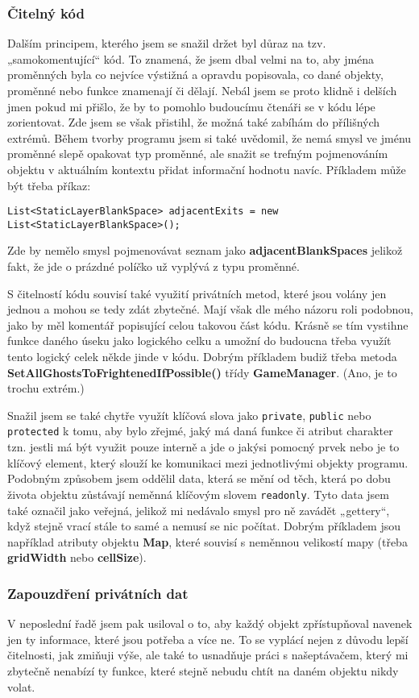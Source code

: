\documentclass[a4]{article}
\begin{document}
\subsubsection{Čitelný kód}
Dalším principem, kterého jsem se snažil držet byl důraz na tzv. „samokomentující“ kód. To znamená, že jsem dbal velmi na to, aby jména proměnných byla co nejvíce výstižná a opravdu popisovala, co dané objekty, proměnné nebo funkce znamenají či dělají. Nebál jsem se proto klidně i delších jmen pokud mi přišlo, že by to pomohlo budoucímu čtenáři se v kódu lépe zorientovat. Zde jsem se však přistihl, že možná také zabíhám do přílišných extrémů. Během tvorby programu jsem si také uvědomil, že nemá smysl ve jménu proměnné slepě opakovat typ proměnné, ale snažit se trefným pojmenováním objektu v aktuálním kontextu přidat informační hodnotu navíc. Příkladem může být třeba příkaz: 

\verb|List<StaticLayerBlankSpace> adjacentExits = new List<StaticLayerBlankSpace>();|

Zde by nemělo smysl pojmenovávat seznam jako \textbf{adjacentBlankSpaces} jelikož fakt, že jde o prázdné políčko už vyplývá z typu proměnné.

S čitelností kódu souvisí také využití privátních metod, které jsou volány jen jednou a mohou se tedy zdát zbytečné. Mají však dle mého názoru roli podobnou, jako by měl komentář popisující celou takovou část kódu. Krásně se tím vystihne funkce daného úseku jako logického celku a umožní do budoucna třeba využít tento logický celek někde jinde v kódu. Dobrým příkladem budiž třeba metoda \textbf{SetAllGhostsToFrightenedIfPossible()} třídy \textbf{GameManager}. (Ano, je to trochu extrém.)

Snažil jsem se také chytře využít klíčová slova jako \verb|private|, \verb|public| nebo \verb|protected| k tomu, aby bylo zřejmé, jaký má daná funkce či atribut charakter tzn. jestli má být využit pouze interně a jde o jakýsi pomocný prvek nebo je to klíčový element, který slouží ke komunikaci mezi jednotlivými objekty programu. Podobným způsobem jsem oddělil data, která se mění od těch, která po dobu života objektu zůstávají neměnná klíčovým slovem \verb|readonly|. Tyto data jsem také označil jako veřejná, jelikož mi nedávalo smysl pro ně zavádět „gettery“, když stejně vrací stále to samé a nemusí se nic počítat. Dobrým příkladem jsou například atributy objektu \textbf{Map}, které souvisí s neměnnou velikostí mapy (třeba \textbf{gridWidth} nebo \textbf{cellSize}).
\subsubsection{Zapouzdření privátních dat}
V neposlední řadě jsem pak usiloval o to, aby každý objekt zpřístupňoval navenek jen ty informace, které jsou potřeba a více ne. To se vyplácí nejen z důvodu lepší čitelnosti, jak zmiňuji výše, ale také to usnadňuje práci s našeptávačem, který mi zbytečně nenabízí ty funkce, které stejně nebudu chtít na daném objektu nikdy volat.
\end{document}
